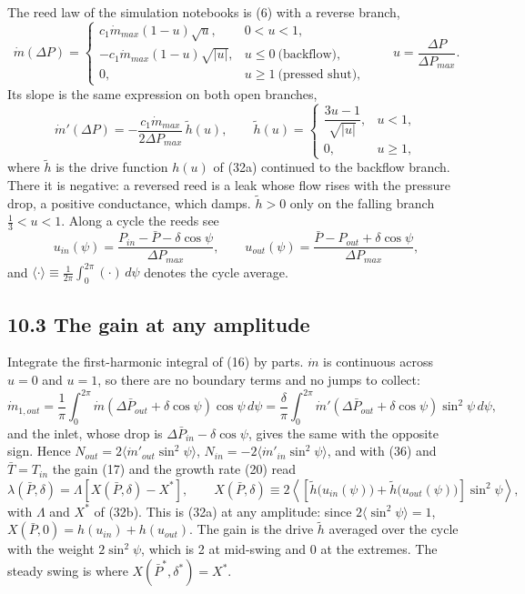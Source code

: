 The reed law of the simulation notebooks is (6) with a reverse branch,
\begin{equation}
\dot m(\Delta P) = \begin{cases} c_1\dot m_{max}(1-u)\sqrt u, & 0 < u < 1, \\[2pt] -c_1\dot m_{max}(1-u)\sqrt{\lvert u\rvert}, & u \le 0 \ \text{(backflow)}, \\[2pt] 0, & u \ge 1 \ \text{(pressed shut)}, \end{cases} \qquad u = \frac{\Delta P}{\Delta P_{max}} . \tag{35}
\end{equation}
Its slope is the same expression on both open branches,
\begin{equation}
\dot m'(\Delta P) = -\frac{c_1\dot m_{max}}{2\Delta P_{max}}\,\tilde h(u), \qquad
\tilde h(u) = \begin{cases} \dfrac{3u-1}{\sqrt{\lvert u\rvert}}, & u < 1, \\[6pt] 0, & u \ge 1 , \end{cases} \tag{36}
\end{equation}
where $\tilde h$ is the drive function $h(u)$ of (32a) continued to the backflow branch. There it is negative: a reversed reed is a leak whose flow rises with the pressure drop, a positive conductance, which damps. $\tilde h > 0$ only on the falling branch $\tfrac13 < u < 1$. Along a cycle the reeds see
\[
u_{in}(\psi) = \frac{P_{in} - \bar P - \delta\cos\psi}{\Delta P_{max}}, \qquad u_{out}(\psi) = \frac{\bar P - P_{out} + \delta\cos\psi}{\Delta P_{max}},
\]
and $\langle\cdot\rangle \equiv \frac{1}{2\pi}\int_0^{2\pi}(\cdot)\,d\psi$ denotes the cycle average.

\subsection*{10.3 The gain at any amplitude}

Integrate the first-harmonic integral of (16) by parts. $\dot m$ is continuous across $u = 0$ and $u = 1$, so there are no boundary terms and no jumps to collect:
\[
\dot m_{1,out} = \frac{1}{\pi}\int_0^{2\pi}\dot m\left(\Delta\bar P_{out} + \delta\cos\psi\right)\cos\psi\,d\psi
= \frac{\delta}{\pi}\int_0^{2\pi}\dot m'\left(\Delta\bar P_{out} + \delta\cos\psi\right)\sin^2\psi\,d\psi ,
\]
and the inlet, whose drop is $\Delta\bar P_{in} - \delta\cos\psi$, gives the same with the opposite sign. Hence $N_{out} = 2\langle\dot m'_{out}\sin^2\psi\rangle$, $N_{in} = -2\langle\dot m'_{in}\sin^2\psi\rangle$, and with (36) and $\bar T = T_{in}$ the gain (17) and the growth rate (20) read
\begin{equation}
\lambda(\bar P,\delta) = \Lambda\left[X(\bar P,\delta) - X^*\right], \qquad
X(\bar P,\delta) \equiv 2\left\langle\left[\tilde h\big(u_{in}(\psi)\big) + \tilde h\big(u_{out}(\psi)\big)\right]\sin^2\psi\right\rangle , \tag{37}
\end{equation}
with $\Lambda$ and $X^*$ of (32b). This is (32a) at any amplitude: since $2\langle\sin^2\psi\rangle = 1$, $X(\bar P, 0) = h(u_{in}) + h(u_{out})$. The gain is the drive $\tilde h$ averaged over the cycle with the weight $2\sin^2\psi$, which is 2 at mid-swing and 0 at the extremes. The steady swing is where $X(\bar P^*, \delta^*) = X^*$.

